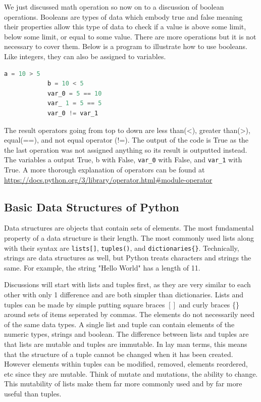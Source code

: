\documentclass[11pt,a4paper]{book}
\begin{document}
			We just discussed math operation so now on to a discussion of boolean operations. Booleans are types of data which embody true and false meaning their properties allow this type of data to check if a value is above some limit, below some limit, or equal to some value. There are more operations but it is not necessary to cover them. Below is a program to illustrate how to use booleans. Like integers, they can also be assigned to variables.
			
			\begin{lstlisting}[language=Python, caption = basic operators of Python] 
			a = 10 > 5
			b = 10 < 5
			var_0 = 5 == 10
			var_ 1 = 5 == 5 
			var_0 != var_1
			\end{lstlisting}
			
			The result operators going from top to down are less than(<), greater than(>), equal(==), and not equal operator (!=). The output of the code is True as the the last operation was not assigned anything so its result is outputted instead. The variables a output True, b with False, \lstinline{var_0} with False, and \lstinline{var_1} with True. A more thorough explanation of operators can be found at \url{https://docs.python.org/3/library/operator.html#module-operator}
			
		\subsection{Basic Data Structures of Python}
			\label{subsec: Basic Data Structures of Python}
			Data structures are objects that contain sets of elements. The most fundamental property of a data structure is their length. The most commonly used lists along with their syntax are \lstinline{lists[]}, \lstinline{tuples()}, and \lstinline|dictionaries{}|. Technically, strings are data structures as well, but Python treats characters and strings the same. For example, the string "Hello World" has a length of 11. 
			
			Discussions will start with lists and tuples first, as they are very similar to each other with only 1 difference and are both simpler than dictionaries. Lists and tuples can be made by simple putting square braces \([]\) and curly braces \{\} around sets of items seperated by commas. The elements do not necessarily need of the same data types. A single list and tuple can contain elements of the numeric types, strings and boolean. The difference between lists and tuples are that lists are mutable and tuples are immutable. In lay man terms, this means that the structure of a tuple cannot be changed when it has been created. However elements within tuples can be modified, removed, elements reordered, etc since they are mutable. Think of mutate and mutations, the ability to change. This mutability of lists make them far more commonly used and by far more useful than tuples.
			
\end{document}
